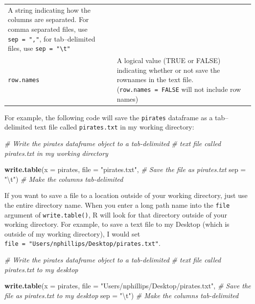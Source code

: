 \documentclass[]{book}
\newenvironment{Shaded}{\begin{snugshade}}{\end{snugshade}}
\newcommand{\KeywordTok}[1]{\textcolor[rgb]{0.13,0.29,0.53}{\textbf{#1}}}
\newcommand{\DataTypeTok}[1]{\textcolor[rgb]{0.13,0.29,0.53}{#1}}
\newcommand{\CharTok}[1]{\textcolor[rgb]{0.31,0.60,0.02}{#1}}
\newcommand{\StringTok}[1]{\textcolor[rgb]{0.31,0.60,0.02}{#1}}
\newcommand{\CommentTok}[1]{\textcolor[rgb]{0.56,0.35,0.01}{\textit{#1}}}
\newcommand{\NormalTok}[1]{#1}
\theoremstyle{definition}
\theoremstyle{definition}
\theoremstyle{remark}
\begin{document}
\begin{longtable}[]{@{}ll@{}}
\begin{minipage}[t]{0.67\columnwidth}
A string indicating how the columns are separated. For comma separated
files, use \texttt{sep\ =\ ","}, for tab--delimited files, use
\texttt{sep\ =\ "\textbackslash{}t"}\strut
\end{minipage}\tabularnewline
\begin{minipage}[t]{0.18\columnwidth}\raggedright\strut
\texttt{row.names}\strut
\end{minipage} & \begin{minipage}[t]{0.67\columnwidth}\raggedright\strut
A logical value (TRUE or FALSE) indicating whether or not save the
rownames in the text file. (\texttt{row.names\ =\ FALSE} will not
include row names)\strut
\end{minipage}\tabularnewline
\bottomrule
\end{longtable}

For example, the following code will save the \texttt{pirates} dataframe
as a tab--delimited text file called \texttt{pirates.txt} in my working
directory:

\begin{Shaded}
\begin{Highlighting}[]
\CommentTok{# Write the pirates dataframe object to a tab-delimited}
\CommentTok{#  text file called pirates.txt in my working directory}

\KeywordTok{write.table}\NormalTok{(}\DataTypeTok{x =}\NormalTok{ pirates,}
            \DataTypeTok{file =} \StringTok{"pirates.txt"}\NormalTok{,  }\CommentTok{# Save the file as pirates.txt}
            \DataTypeTok{sep =} \StringTok{"}\CharTok{\textbackslash{}t}\StringTok{"}\NormalTok{)            }\CommentTok{# Make the columns tab-delimited}
\end{Highlighting}
\end{Shaded}

If you want to save a file to a location outside of your working
directory, just use the entire directory name. When you enter a long
path name into the \texttt{file} argument of \texttt{write.table()}, R
will look for that directory outside of your working directory. For
example, to save a text file to my Desktop (which is outside of my
working directory), I would set
\texttt{file\ =\ "Users/nphillips/Desktop/pirates.txt"}.

\begin{Shaded}
\begin{Highlighting}[]
\CommentTok{# Write the pirates dataframe object to a tab-delimited}
\CommentTok{#  text file called pirates.txt to my desktop}

\KeywordTok{write.table}\NormalTok{(}\DataTypeTok{x =}\NormalTok{ pirates,}
            \DataTypeTok{file =} \StringTok{"Users/nphillips/Desktop/pirates.txt"}\NormalTok{,  }\CommentTok{# Save the file as pirates.txt to my desktop}
            \DataTypeTok{sep =} \StringTok{"}\CharTok{\textbackslash{}t}\StringTok{"}\NormalTok{)                                    }\CommentTok{# Make the columns tab-delimited}
\end{Highlighting}
\end{Shaded}
\end{document}
